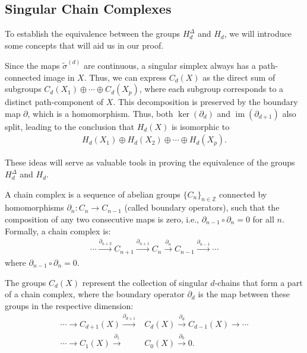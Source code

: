 \subsection{Singular Chain Complexes}
\label{SingularChainComplexes}
To establish the equivalence between the groups \( H_{d}^{\Delta} \) and \( H_{d} \), we will introduce some concepts that will aid us in our proof.

Since the maps \( \tilde{\sigma}^{(d)} \) are continuous, a singular simplex always has a path-connected image in \( X \). Thus, we can express \( C_{d}(X) \) as the direct sum of subgroups \( C_{d}(X_{1}) \oplus \cdots \oplus C_{d}(X_{p}) \), where each subgroup corresponds to a distinct path-component of \( X \). This decomposition is preserved by the boundary map \( \partial \), which is a homomorphism. Thus, both \( \ker(\partial_{d}) \) and \( \operatorname{im}(\partial_{d+1}) \) also split, leading to the conclusion that \( H_{d}(X) \) is isomorphic to
\begin{align}
H_{d}(X_{1}) \oplus H_{d}(X_{2}) \oplus \cdots \oplus H_{d}(X_{p}).
\end{align}

These ideas will serve as valuable tools in proving the equivalence of the groups \( H_{d}^{\Delta} \) and \( H_{d} \).

\begin{definition}
\label{ChainComplex}
A chain complex is a sequence of abelian groups \(\{C_n\}_{n \in \mathbb{Z}}\) connected by homomorphisms \(\partial_n: C_n \to C_{n-1}\) (called boundary operators), such that the composition of any two consecutive maps is zero, i.e., \(\partial_{n-1} \circ \partial_n = 0\) for all \(n\). Formally, a chain complex is:
\begin{align}
\cdots \xrightarrow{\partial_{n+2}} C_{n+1} \xrightarrow{\partial_{n+1}} C_n \xrightarrow{\partial_n} C_{n-1} \xrightarrow{\partial_{n-1}} \cdots
\end{align}
where \(\partial_{n-1} \circ \partial_n = 0\).
\end{definition}

\begin{example}
	The groups $C_{d}(X)$ represent the collection of singular $d$-chains that form
	a part of a chain complex, where the boundary operator $\partial_{d}$ is the map between these groups in the respective dimension:
	\begin{align}
		\cdots \xrightarrow{}C_{d+1}(X) \xrightarrow{\partial_{d+1}} & C_{d}(X) \xrightarrow{\partial_d}C_{d-1}(X) \xrightarrow{}\cdots \\
		\cdots \xrightarrow{}C_{1}(X) \xrightarrow{\partial_1}       & C_{0}(X) \xrightarrow{\partial_0}0.
	\end{align}
\end{example}

